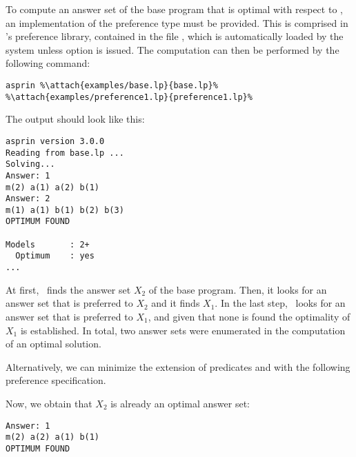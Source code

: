 \begin{example}
To compute an answer set of the base program that is optimal with respect to , 
an implementation of the preference type  must be provided.
This is comprised in \asprin's preference library,
contained in the file ,
which is automatically loaded by the system unless option  is issued.
The computation can then be performed by the following command:
%
%
\begin{lstlisting}[numbers=none,escapechar=\%]
asprin %\attach{examples/base.lp}{base.lp}% %\attach{examples/preference1.lp}{preference1.lp}% 
\end{lstlisting}
%
The output should look like this:
%
\begin{lstlisting}[numbers=none]
asprin version 3.0.0
Reading from base.lp ...
Solving...
Answer: 1
m(2) a(1) a(2) b(1)
Answer: 2
m(1) a(1) b(1) b(2) b(3)
OPTIMUM FOUND

Models       : 2+
  Optimum    : yes
...
\end{lstlisting}
%
At first, \asprin\ finds the answer set $X_2$ of the base program. 
Then, it looks for an answer set that is preferred to $X_2$ and it finds $X_1$. 
In the last step, \asprin\ looks for an answer set that is preferred to $X_1$,  
and given that none is found the optimality of $X_1$ is established. 
In total, two answer sets were enumerated in the computation of an optimal solution.

Alternatively,
we can minimize the extension of predicates  and  with the following preference specification.
%

%
Now, we obtain that $X_2$ is already an optimal answer set: 
\begin{lstlisting}[numbers=none]
Answer: 1
m(2) a(2) a(1) b(1)
OPTIMUM FOUND
\end{lstlisting}
\end{example}

